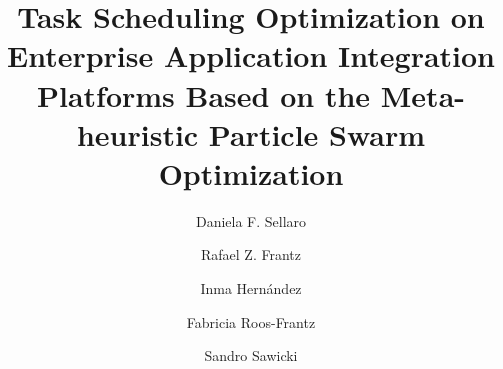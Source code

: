 \documentclass[sigconf]{acmart}
\begin{document}
	
\title{Task Scheduling Optimization on Enterprise Application Integration Platforms Based on the Meta-heuristic Particle Swarm Optimization}



\author{Daniela F. Sellaro}

\author{Rafael Z. Frantz}

\author{Inma Hernández}
\affiliation{%
	\institution{University of Seville}
	\coutry{Espanha} 
}

\author{Fabricia Roos-Frantz}

\author{Sandro Sawicki}


\renewcommand{\shortauthors}{Daniela F. Sellaro et al.}
\renewcommand{\shorttitle}{Task Scheduling Optimization on EAI Platforms Based on the Meta-heuristic PSO}

\end{document}
